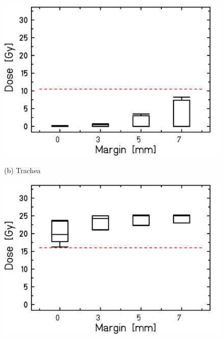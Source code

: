 \begin{figure}[H]
\begin{minipage}{0.31\textwidth}
  \includegraphics[width=\textwidth]{./teile/results_human/Whisker_TRACHEA_IMPT_woOverlap_otherParameters.png}
\end{minipage}
\hfill
\vspace*{0.1cm}
\begin{minipage}{\textwidth}
 \hspace*{7.5cm} (b) Trachea \\
\end{minipage}
\hfill
\begin{minipage}{0.31\textwidth}
  \includegraphics[width=\textwidth]{./teile/results_human/Whisker_HEARTwoOverlap_ITV.png}
\end{minipage}
\hfill
\begin{minipage}{0.31\textwidth}

\end{minipage}
\end{figure}
